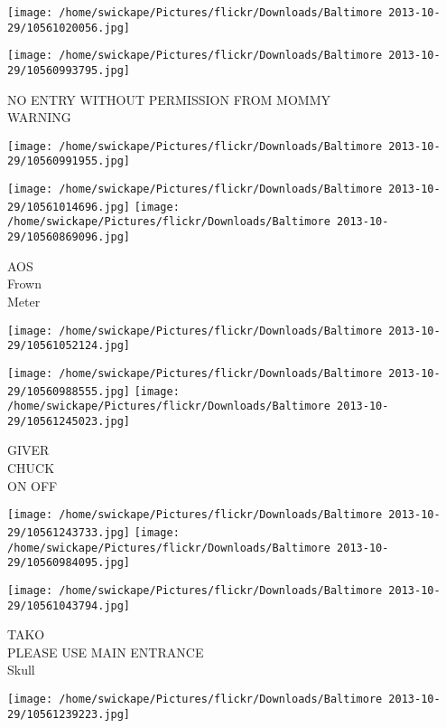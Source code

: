 \documentclass[10pt,letterpaper]{article}
\begin{document}
\texttt{[image: /home/swickape/Pictures/flickr/Downloads/Baltimore 2013-10-29/10561020056.jpg]}

\vspace{0.25in}
\texttt{[image: /home/swickape/Pictures/flickr/Downloads/Baltimore 2013-10-29/10560993795.jpg]}

NO ENTRY WITHOUT PERMISSION FROM MOMMY\\
WARNING\\
\pagebreak

\texttt{[image: /home/swickape/Pictures/flickr/Downloads/Baltimore 2013-10-29/10560991955.jpg]}

\vspace{0.25in}
\texttt{[image: /home/swickape/Pictures/flickr/Downloads/Baltimore 2013-10-29/10561014696.jpg]}
\texttt{[image: /home/swickape/Pictures/flickr/Downloads/Baltimore 2013-10-29/10560869096.jpg]}

AOS\\
Frown\\
Meter\\
\pagebreak

\texttt{[image: /home/swickape/Pictures/flickr/Downloads/Baltimore 2013-10-29/10561052124.jpg]}

\vspace{0.25in}
\texttt{[image: /home/swickape/Pictures/flickr/Downloads/Baltimore 2013-10-29/10560988555.jpg]}
\texttt{[image: /home/swickape/Pictures/flickr/Downloads/Baltimore 2013-10-29/10561245023.jpg]}

GIVER\\
CHUCK\\
ON OFF\\
\pagebreak

\texttt{[image: /home/swickape/Pictures/flickr/Downloads/Baltimore 2013-10-29/10561243733.jpg]}
\texttt{[image: /home/swickape/Pictures/flickr/Downloads/Baltimore 2013-10-29/10560984095.jpg]}

\texttt{[image: /home/swickape/Pictures/flickr/Downloads/Baltimore 2013-10-29/10561043794.jpg]}

TAKO\\
PLEASE USE MAIN ENTRANCE\\
Skull\\
\pagebreak

\texttt{[image: /home/swickape/Pictures/flickr/Downloads/Baltimore 2013-10-29/10561239223.jpg]}
\end{document}
